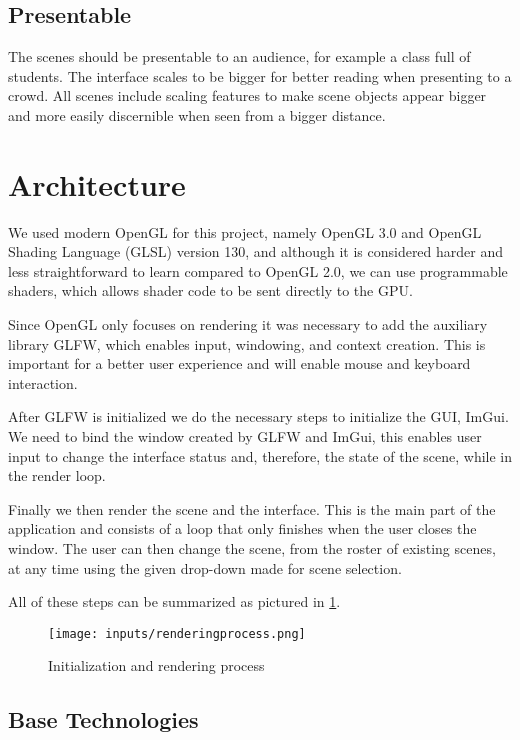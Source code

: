 \documentclass[cic,tc,english]{iiufrgs}
\begin{document}
\subsection{Presentable}
The scenes should be presentable to an audience, for example a class full of students. The interface scales to be bigger for better reading when presenting to a crowd. All scenes include scaling features to make scene objects appear bigger and more easily discernible when seen from a bigger distance.

\section{Architecture}
We used modern OpenGL for this project, namely OpenGL 3.0 and OpenGL Shading Language (GLSL) version 130, and although it is considered harder and less straightforward to learn compared to OpenGL 2.0, we can use programmable shaders, which allows shader code to be sent directly to the GPU.

Since OpenGL only focuses on rendering it was necessary to add the auxiliary library GLFW, which enables input, windowing, and context creation. This is important for a better user experience and will enable mouse and keyboard interaction.

After GLFW is initialized we do the necessary steps to initialize the GUI, ImGui. We need to bind the window created by GLFW and ImGui, this enables user input to change the interface status and, therefore, the state of the scene, while in the render loop.

Finally we then render the scene and the interface. This is the main part of the application and consists of a loop that only finishes when the user closes the window. The user can then change the scene, from the roster of existing scenes, at any time using the given drop-down made for scene selection.

All of these steps can be summarized as pictured in \cref{renderingprocess}.

\begin{figure}[hbt!]
    \caption{Initialization and rendering process}
    \begin{center}
        \texttt{[image: inputs/renderingprocess.png]}
    \end{center}
    \label{renderingprocess}
\end{figure}


\subsection{Base Technologies}
\end{document}
